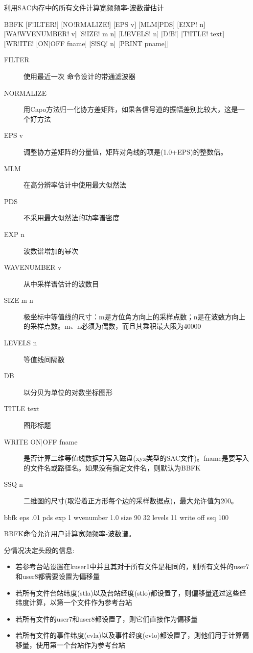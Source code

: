 \label{cmd:bbfk}

利用SAC内存中的所有文件计算宽频频率-波数谱估计

\begin{SACSTX}
BBFK [F!ILTER!] [NO!RMALIZE!] [EPS v] [MLM|PDS] [E!XP! n] [WA!WVENUMBER! v]
    [S!IZE! m n] [L!EVELS! n] [D!B!] [T!ITLE! text] [WR!ITE! [ON|OFF fname]
    [S!SQ! n] [PRINT pname]]
\end{SACSTX}

\begin{description}
\item [FILTER] 使用最近一次 命令设计的带通滤波器
\item [NORMALIZE] 用Capo方法归一化协方差矩阵，如果各信号道的振幅差别比较大，这是一个好方法
\item [EPS v] 调整协方差矩阵的分量值，矩阵对角线的项是(1.0+EPS)的整数倍。
\item [MLM] 在高分辨率估计中使用最大似然法
\item [PDS] 不采用最大似然法的功率谱密度
\item [EXP n] 波数谱增加的幂次
\item [WAVENUMBER v] 从中采样谱估计的波数目
\item [SIZE m n] 极坐标中等值线的尺寸：m是方位角方向上的采样点数；n是在波数方向上的采样点数。m、n必须为偶数，而且其乘积最大限为40000
\item [LEVELS n] 等值线间隔数
\item [DB] 以分贝为单位的对数坐标图形
\item [TITLE text] 图形标题
\item [WRITE ON|OFF fname] 是否计算二维等值线数据并写入磁盘(xyz类型的SAC文件)。fname是要写入的文件名或路径名。如果没有指定文件名，则默认为BBFK
\item [SSQ n] 二维图的尺寸(取沿着正方形每个边的采样数据点)，最大允许值为200。
\end{description}

\begin{SACDFT}
bbfk eps .01 pds exp 1 wvenumber 1.0 size 90 32 levels 11
    write off ssq 100
\end{SACDFT}

BBFK命令允许用户计算宽频频率-波数谱。

分情况决定头段的信息:
\begin{itemize}
\item 若参考台站设置在kuser1中并且其对于所有文件是相同的，则所有文件的user7和user8都需要设置为偏移量
\item 若所有文件台站纬度(stla)以及台站经度(stlo)都设置了，则偏移量通过这些经纬度计算，以第一个文件作为参考台站
\item 若所有文件的user7和user8都设置了，则它们直接作为偏移量
\item 若所有文件的事件纬度(evla)以及事件经度(evlo)都设置了，则他们用于计算偏移量，使用第一个台站作为参考台站
\end{itemize}

